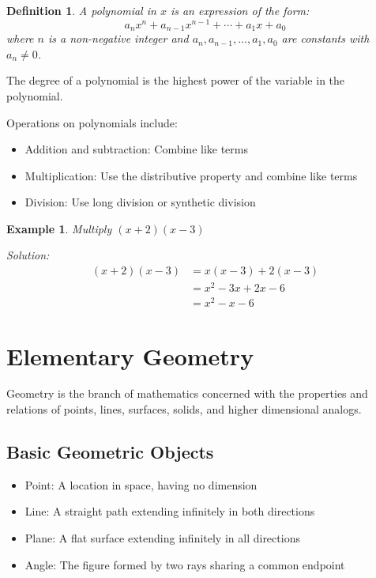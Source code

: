 \documentclass[12pt,a4paper]{article}
\newtheorem{definition}{Definition}
\newtheorem{example}{Example}
\begin{document}
\begin{definition}
A polynomial in $x$ is an expression of the form:
\[ a_nx^n + a_{n-1}x^{n-1} + \cdots + a_1x + a_0 \]
where $n$ is a non-negative integer and $a_n, a_{n-1}, \ldots, a_1, a_0$ are constants with $a_n \neq 0$.
\end{definition}

The degree of a polynomial is the highest power of the variable in the polynomial.

Operations on polynomials include:
\begin{itemize}
    \item Addition and subtraction: Combine like terms
    \item Multiplication: Use the distributive property and combine like terms
    \item Division: Use long division or synthetic division
\end{itemize}

\begin{example}
Multiply $(x + 2)(x - 3)$

Solution:
\begin{align*}
    (x + 2)(x - 3) &= x(x - 3) + 2(x - 3) \\
    &= x^2 - 3x + 2x - 6 \\
    &= x^2 - x - 6
\end{align*}
\end{example}

\section{Elementary Geometry}

Geometry is the branch of mathematics concerned with the properties and relations of points, lines, surfaces, solids, and higher dimensional analogs.

\subsection{Basic Geometric Objects}

\begin{itemize}
    \item Point: A location in space, having no dimension
    \item Line: A straight path extending infinitely in both directions
    \item Plane: A flat surface extending infinitely in all directions
    \item Angle: The figure formed by two rays sharing a common endpoint
\end{itemize}
\end{document}
